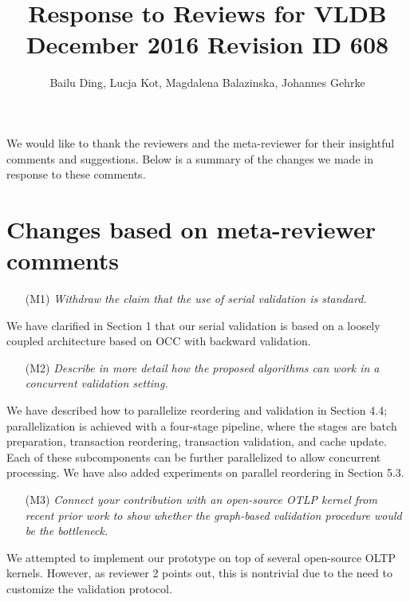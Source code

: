 \documentclass{article}
\begin{document}
\title{Response to Reviews for VLDB December 2016 Revision ID 608}
\author{Bailu Ding, Lucja Kot, Magdalena Balazinska, Johannes Gehrke}
\maketitle

We would like to thank the reviewers and the meta-reviewer for their insightful comments and suggestions. Below is a summary of the changes we made in response to these comments.

\section{Changes based on meta-reviewer comments}

\begin{itemize}
\item[(M1)] \emph{Withdraw the claim that the use of serial validation is standard. }
\end{itemize}
\vspace{-1em}
We have clarified in Section 1 that our serial validation is based on a loosely coupled architecture based on OCC with backward validation.

\begin{itemize}
\item[(M2)] \emph{Describe in more detail how the proposed algorithms can work in a concurrent validation setting. }
\end{itemize}
\vspace{-1em}
We have described how to parallelize reordering and validation in Section 4.4; parallelization is achieved with a four-stage pipeline, where the stages are batch preparation, transaction reordering, transaction validation, and cache update. Each of these subcomponents can be further parallelized to allow concurrent processing. We have also added experiments on parallel reordering in Section 5.3. 

\begin{itemize}
\item[(M3)]  \emph{Connect your contribution with an open-source OTLP kernel from recent prior work to show whether the graph-based validation procedure would be the bottleneck.}
\end{itemize}
\vspace{-1em}
We attempted to implement our prototype on top of several open-source OLTP kernels. However, as reviewer 2 points out, this is nontrivial due to the need to customize the validation protocol.
\end{document}
